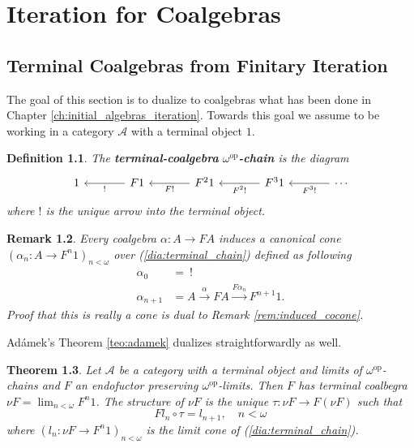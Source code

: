 \documentclass[letterpaper, 11pt, oneside]{memoir}
\theoremstyle{myteo}
\newtheorem{theorem}{Theorem}[section]
\newtheorem{definition}[theorem]{Definition}
\newtheorem{remark}[theorem]{Remark}
\numberwithin{equation}{section}
\newcommand{\marginnote}[1]{\marginpar{\footnotesize #1}}
\newcommand{\op}{\text{op}}
\newcommand{\A}{\mathscr{A}}
\begin{document}
\chapter{Iteration for Coalgebras}
\newpage

\section{Terminal Coalgebras from Finitary Iteration}

The goal of this section is to dualize to coalgebras what has been done in Chapter \ref{ch:initial_algebras_iteration}.
Towards this goal we assume to be working in a category \(\A\) with a terminal object \(1\).

\begin{definition}
  The \textbf{terminal-coalgebra} \(\omega^{\op}\)\textbf{-chain}\marginnote{terminal-algebra \(\omega^\op\)-chain} is the diagram
    \begin{equation}
    \label{dia:terminal_chain}
    \begin{tikzcd}[sep = large]
      1  & F1 \ar[l, "!"] & F^21  \ar[l, "F!"] & F^31 \ar[l, "F^2!"] & \cdots  \ar[l, "F^3!"]
    \end{tikzcd}
    \end{equation}
    where \(!\) is the unique arrow into the terminal object.
\end{definition}

\begin{remark}
  Every coalgebra \(\alpha : A \to FA\) induces a canonical cone \((\alpha_n : A \to F^n1)_{n < \omega}\) over (\ref{dia:terminal_chain}) defined as following
  \begin{align*}
    \alpha_0 &=\ ! \\
    \alpha_{n+1} &= A \xrightarrow{\alpha} FA \xrightarrow{F\alpha_n} F^{n+1}1.
  \end{align*}
  Proof that this is really a cone is dual to Remark \ref{rem:induced_cocone}.
\end{remark}

Adámek's Theorem \ref{teo:adamek} dualizes straightforwardly as well.

\begin{theorem}
  \label{teo:coadamek}
  Let \(\A\) be a category with a terminal object and limits of \(\omega^\op\)-chains and \(F\) an endofuctor preserving \(\omega^\op\)-limits.
  Then \(F\) has terminal coalbegra \(\nu F = \lim_{n < \omega} F^n1\).
  The structure of \(\nu F\) is the unique \(\tau: \nu F \to F(\nu F)\) such that
  \begin{equation}
    \label{eq:aa}
    Fl_n \circ \tau = l_{n+1}, \quad n < \omega
  \end{equation}
  where \((l_n: \nu F \to F^n1)_{n < \omega}\) is the limit cone of (\ref{dia:terminal_chain}).
\end{theorem}
\end{document}
